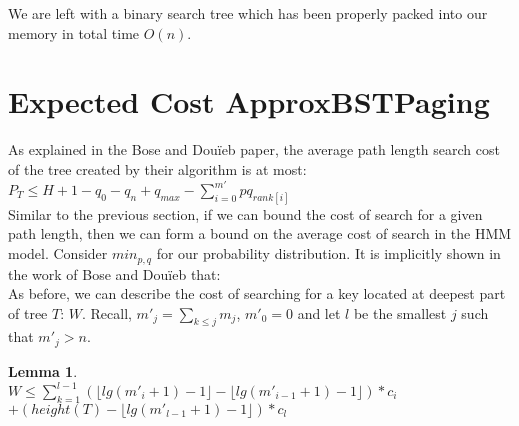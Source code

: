 \documentclass[letterpaper,12pt,titlepage,oneside,final]{book}
\theoremstyle{plain}
\newtheorem{lem}[thm]{Lemma}
\begin{document}
We are left with a binary search tree which has been properly packed into our memory in total time $O(n)$.


\section{Expected Cost ApproxBSTPaging}

As explained in the Bose and Dou\"{i}eb paper, the average path length search cost of the tree created by their algorithm is at most:\\ \cite{bose2009efficient}
$P_T \leq H + 1 - q_0 - q_n + q_{max} - \sum_{i=0}^{m'} pq_{rank[i]}$ \\

Similar to the previous section, if we can bound the cost of search for a given path length, then we can form a bound on the average cost of search in the HMM model. Consider $min_{p,q}$ for our probability distribution. It is implicitly shown in the work of Bose and Dou\"{i}eb that: \\

\iffalse
Using this, we can prove a more specific lemma about the height of our tree. 

\begin{lem}
 $height(T) \leq  depth(min_{p,q}) \leq \lfloor lg(\frac{1}{min_{p,q}}) \rfloor + 2$.
\end{lem}

\begin{proof}
I will simply give an outline here as the bulk of the proof follows from statements of Bose and Dou\"{i}eb, and is extremely similar to the ones presented in the previous sections. After \textbf{phase 1} of the algorithm, all "leaves" ($p's$ or $q's$ from our original data set) with probability $pq_i$ have depths of at most $\rfloor lg(\frac{1}{pq_i} \lfloor + 2$. After the final two phases of algorithm, at most one leaf has not moved up the tree. Thus, $depth(min_{p,q}) \leq lg(\frac{1}{min_{p,q}}) + 2$. Since $min_{p,q}$ is the smallest element in the distribution, this gives an upper bound on the height of the whole tree and the result follows.
\end{proof}

\fi


As before, we can describe the cost of searching for a key located at deepest part of tree $T$: $W$. Recall, $m'_j = \sum_{k \leq j} m_j$, $m'_0 = 0$ and let $l$ be the smallest $j$ such that $m'_j > n$.

\begin{lem} \hspace{1cm} \\
$W \leq \sum_{k=1}^{l-1} (\lfloor lg(m'_i+1)-1 \rfloor - \lfloor lg(m'_{i-1}+1)-1 \rfloor)*c_i$\\ $+ (height(T) - \lfloor lg(m'_{l-1}+1)-1 \rfloor)*c_l$ 
\end{lem}
\end{document}

